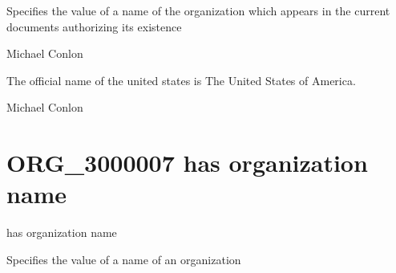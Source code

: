 \documentclass[letterpaper,10pt,english]{sphinxmanual}
\begin{document}
\begin{sphinxShadowBox}

\sphinxAtStartPar
Specifies the value of a name of the organization which appears in the current documents authorizing its existence
\end{sphinxShadowBox}

\begin{sphinxShadowBox}

\sphinxAtStartPar
Michael Conlon 
\end{sphinxShadowBox}

\begin{sphinxShadowBox}

\sphinxAtStartPar
The official name of the united states is The United States of America.
\end{sphinxShadowBox}

\begin{sphinxShadowBox}

\sphinxAtStartPar
Michael Conlon 
\end{sphinxShadowBox}
\begin{quote}
\label{\detokenize{doc-ORG_3000007:org-3000007}}\label{\detokenize{doc-ORG_3000007:has-organization-name}}\label{\detokenize{doc-ORG_3000007:org-3000007}}
\ignorespaces \end{quote}


\section{ORG\_3000007 \sphinxhyphen{} has organization name}
\label{\detokenize{doc-ORG_3000007:org-3000007-has-organization-name}}\label{\detokenize{doc-ORG_3000007:index-0}}\label{\detokenize{doc-ORG_3000007::doc}}
\begin{sphinxShadowBox}

\sphinxAtStartPar
has organization name
\end{sphinxShadowBox}

\begin{sphinxShadowBox}

\sphinxAtStartPar
Specifies the value of a name of an organization
\end{sphinxShadowBox}
\end{document}
